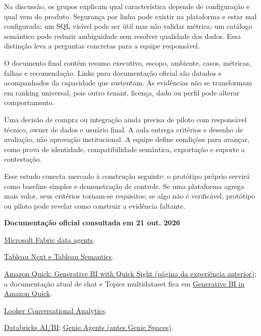 Na discussão, os grupos explicam qual característica depende de configuração e qual vem do produto. Segurança por linha pode existir na plataforma e estar mal configurada; um SQL visível pode ser útil mas não validar métrica; um catálogo semântico pode reduzir ambiguidade sem resolver qualidade dos dados. Essa distinção leva a perguntas concretas para a equipe responsável.

O documento final contém resumo executivo, escopo, ambiente, casos, métricas, falhas e recomendação. Links para documentação oficial são datados e acompanhados da capacidade que sustentam. As evidências não se transformam em ranking universal, pois outro tenant, licença, dado ou perfil pode alterar comportamento.

Uma decisão de compra ou integração ainda precisa de piloto com responsável técnico, owner de dados e usuário final. A aula entrega critérios e desenho de avaliação, não aprovação institucional. A equipe define condições para avançar, como prova de identidade, compatibilidade semântica, exportação e suporte a contestação.

Esse estudo conecta mercado à construção seguinte: o protótipo próprio servirá como baseline simples e demonstração de controle. Se uma plataforma agrega mais valor, seus critérios tornam-se requisitos; se algo não é verificável, protótipo ou piloto pode revelar como construir a evidência faltante.

\clearpage
\bigskip
\noindent\textbf{Documentação oficial consultada em 21 out. 2026}

\begingroup\small
\href{https://learn.microsoft.com/en-us/fabric/data-science/how-to-create-data-agent}{Microsoft Fabric data agents}.\par
\href{https://help.tableau.com/current/tableau-next/en-us/tableau\_next\_tableau\_product\_overview.htm}{Tableau Next e Tableau Semantics}.\par
\href{https://docs.aws.amazon.com/quick/latest/userguide/quicksight-gen-bi.html}{Amazon Quick: Generative BI with Quick Sight (página da experiência anterior)}; a documentação atual de chat e Topics multidataset fica em \href{https://docs.aws.amazon.com/quick/latest/userguide/generative-bi-get-started.html}{Generative BI in Amazon Quick}.\par
\href{https://docs.cloud.google.com/looker/docs/conversational-analytics-overview}{Looker Conversational Analytics}.\par
\href{https://docs.databricks.com/aws/en/ai-bi}{Databricks AI/BI}; \href{https://docs.databricks.com/aws/en/genie-agents/concepts}{Genie Agents (antes Genie Spaces)}.
\endgroup
